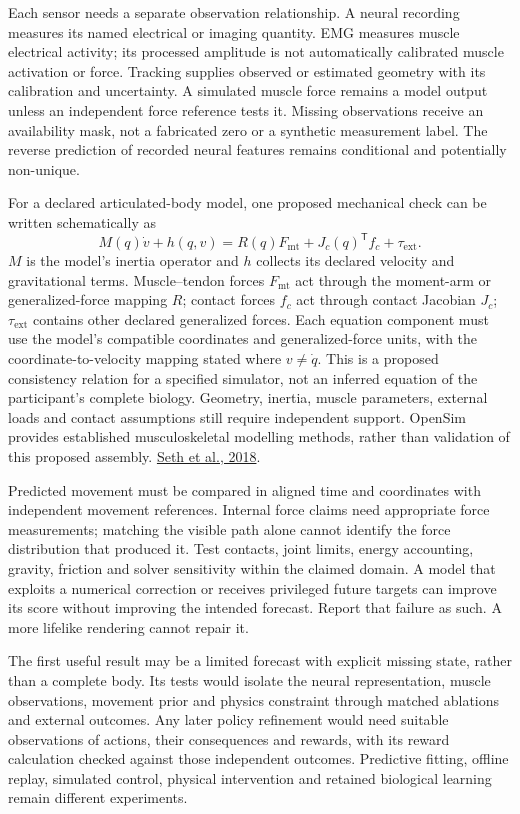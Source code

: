 Each sensor needs a separate observation relationship. A neural recording measures its named electrical or imaging quantity. EMG measures muscle electrical activity; its processed amplitude is not automatically calibrated muscle activation or force. Tracking supplies observed or estimated geometry with its calibration and uncertainty. A simulated muscle force remains a model output unless an independent force reference tests it. Missing observations receive an availability mask, not a fabricated zero or a synthetic measurement label. The reverse prediction of recorded neural features remains conditional and potentially non-unique.

For a declared articulated-body model, one proposed mechanical check can be written schematically as
\[
M(q)\dot v+h(q,v)
 =R(q)F_{\mathrm{mt}}+J_c(q)^{\mathsf T}f_c+\tau_{\mathrm{ext}}.
\]
$M$ is the model's inertia operator and $h$ collects its declared velocity and gravitational terms. Muscle--tendon forces $F_{\mathrm{mt}}$ act through the moment-arm or generalized-force mapping $R$; contact forces $f_c$ act through contact Jacobian $J_c$; $\tau_{\mathrm{ext}}$ contains other declared generalized forces. Each equation component must use the model's compatible coordinates and generalized-force units, with the coordinate-to-velocity mapping stated where $v\neq\dot q$. This is a proposed consistency relation for a specified simulator, not an inferred equation of the participant's complete biology. Geometry, inertia, muscle parameters, external loads and contact assumptions still require independent support. OpenSim provides established musculoskeletal modelling methods, rather than validation of this proposed assembly. \href{https://journals.plos.org/ploscompbiol/article?id=10.1371/journal.pcbi.1006223}{Seth et al., 2018}.

Predicted movement must be compared in aligned time and coordinates with independent movement references. Internal force claims need appropriate force measurements; matching the visible path alone cannot identify the force distribution that produced it. Test contacts, joint limits, energy accounting, gravity, friction and solver sensitivity within the claimed domain. A model that exploits a numerical correction or receives privileged future targets can improve its score without improving the intended forecast. Report that failure as such. A more lifelike rendering cannot repair it.

The first useful result may be a limited forecast with explicit missing state, rather than a complete body. Its tests would isolate the neural representation, muscle observations, movement prior and physics constraint through matched ablations and external outcomes. Any later policy refinement would need suitable observations of actions, their consequences and rewards, with its reward calculation checked against those independent outcomes. Predictive fitting, offline replay, simulated control, physical intervention and retained biological learning remain different experiments.

